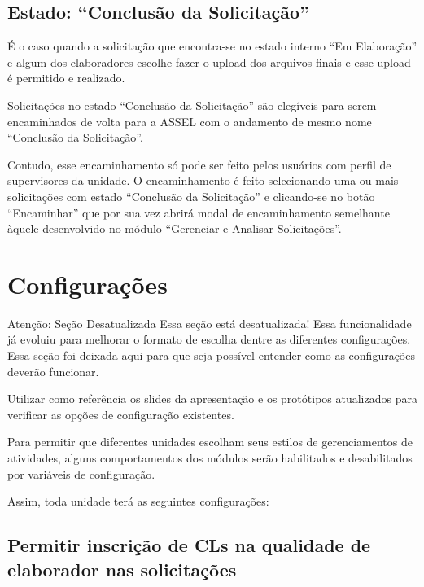 



\subsection{Estado: ``Conclusão da Solicitação''}

É o caso quando a solicitação que encontra-se no estado interno ``Em Elaboração'' e algum dos elaboradores escolhe fazer o upload dos arquivos finais e esse upload é permitido e realizado. 

Solicitações no estado ``Conclusão da Solicitação'' são elegíveis para serem encaminhados de volta para a ASSEL com o andamento de mesmo nome ``Conclusão da Solicitação''. 

Contudo, esse encaminhamento só pode ser feito pelos usuários com perfil de supervisores da unidade. O encaminhamento é feito selecionando uma ou mais solicitações com estado  ``Conclusão da Solicitação'' e clicando-se no botão ``Encaminhar'' que por sua vez abrirá modal de encaminhamento semelhante àquele desenvolvido no módulo ``Gerenciar e Analisar Solicitações''.

\section{Configurações}


\begin{nota}{Atenção: Seção Desatualizada}
	Essa seção está desatualizada! Essa funcionalidade já evoluiu para melhorar o formato de escolha dentre as diferentes configurações. Essa seção foi deixada aqui para que seja possível entender como as configurações  deverão funcionar. 
	
	\tcblower
	
	Utilizar como referência os slides da apresentação e os protótipos atualizados para verificar as opções de configuração existentes.
\end{nota}

Para permitir que diferentes unidades escolham seus estilos de gerenciamentos de atividades, alguns comportamentos dos módulos serão habilitados e desabilitados por variáveis de configuração.

Assim, toda unidade terá as seguintes configurações:

\subsection{Permitir inscrição de CLs na qualidade de elaborador nas solicitações}

